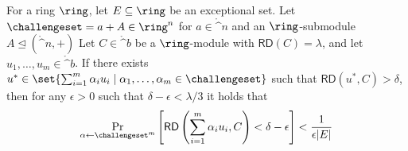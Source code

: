 \begin{theorem}
\label{thm:proximity-gap-modules}
For a ring $\ring$, let $E \subseteq \ring$ be an exceptional set. Let $\challengeset=a+A \in \ring^n$ for $a \in \ring^n$ and an $\ring$-submodule $A \trianglelefteq (\ring^n,+)$
Let $C \in \ring^b$ be a $\ring$-module with $\mathsf{RD}(C) = \lambda$, and let $u_1,\dotsc,u_m \in \ring^b$. If there exists $u^\ast \in \set{\sum_{i=1}^{m} \alpha_i u_i \mid \alpha_1,\dotsc,\alpha_m \in \challengeset}$ such that $\mathsf{RD}(u^\ast, C) > \delta$, then for any $\epsilon > 0$ such that $\delta-\epsilon < \lambda/3$ it holds that
\[
\Pr_{\alpha \gets \challengeset^m} \left[\mathsf{RD}\left(\sum_{i=1}^{m} \alpha_i u_i,C\right) < \delta - \epsilon\right] < \frac{1}{\epsilon |E|}
\]
\end{theorem}

